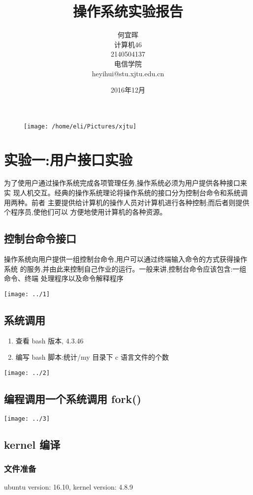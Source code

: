 \documentclass{article}
\date{2016年12月}
\title{操作系统实验报告}
\author{何宜晖\\计算机46\\2140504137\\电信学院\\heyihui@stu.xjtu.edu.cn}
\begin{document}
\begin{CJK}{UTF8}{gkai}
\begin{figure}
\centering
\texttt{[image: /home/eli/Pictures/xjtu]}
\end{figure}


\maketitle
\clearpage
\section{实验一:用户接口实验}
为了使用户通过操作系统完成各项管理任务,操作系统必须为用户提供各种接口来实
现人机交互。经典的操作系统理论将操作系统的接口分为控制台命令和系统调用两种。前者
主要提供给计算机的操作人员对计算机进行各种控制;而后者则提供个程序员,使他们可以
方便地使用计算机的各种资源。
\subsection{控制台命令接口}
操作系统向用户提供一组控制台命令,用户可以通过终端输入命令的方式获得操作系统
的服务,并由此来控制自己作业的运行。一般来讲,控制台命令应该包含:一组命令、终端
处理程序以及命令解释程序

\texttt{[image: ../1]}
\subsection{系统调用}
\begin{enumerate}
\item 查看 bash 版本, 4.3.46
\item 编写 bash 脚本:统计/my 目录下 c 语言文件的个数
\end{enumerate}

\texttt{[image: ../2]}

\subsection{编程调用一个系统调用 fork()}
\texttt{[image: ../3]}

\subsection{kernel 编译}
\subsubsection{文件准备}
ubuntu version: 16.10, kernel version: 4.8.9


\end{CJK}
\end{document}
